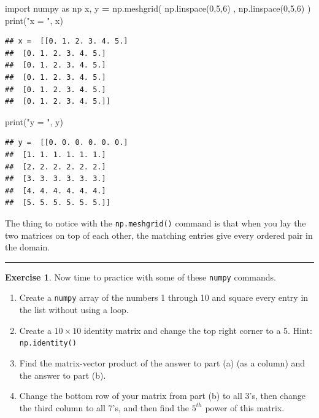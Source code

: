 \documentclass[
]{book}
\newenvironment{Shaded}{\begin{snugshade}}{\end{snugshade}}
\newcommand{\BuiltInTok}[1]{#1}
\newcommand{\DecValTok}[1]{\textcolor[rgb]{0.00,0.00,0.81}{#1}}
\newcommand{\ImportTok}[1]{#1}
\newcommand{\NormalTok}[1]{#1}
\newcommand{\OperatorTok}[1]{\textcolor[rgb]{0.81,0.36,0.00}{\textbf{#1}}}
\newcommand{\StringTok}[1]{\textcolor[rgb]{0.31,0.60,0.02}{#1}}
\providecommand{\tightlist}{%
  \setlength{\itemsep}{0pt}\setlength{\parskip}{0pt}}
\theoremstyle{definition}
\theoremstyle{definition}
\theoremstyle{definition}
\newtheorem{exercise}{Exercise}[chapter]
\theoremstyle{remark}
\begin{document}
\begin{Shaded}
\begin{Highlighting}[]
\ImportTok{import}\NormalTok{ numpy }\ImportTok{as}\NormalTok{ np}
\NormalTok{x, y }\OperatorTok{=}\NormalTok{ np.meshgrid( np.linspace(}\DecValTok{0}\NormalTok{,}\DecValTok{5}\NormalTok{,}\DecValTok{6}\NormalTok{) , np.linspace(}\DecValTok{0}\NormalTok{,}\DecValTok{5}\NormalTok{,}\DecValTok{6}\NormalTok{) )}
\BuiltInTok{print}\NormalTok{(}\StringTok{"x = "}\NormalTok{, x)}
\end{Highlighting}
\end{Shaded}

\begin{verbatim}
## x =  [[0. 1. 2. 3. 4. 5.]
##  [0. 1. 2. 3. 4. 5.]
##  [0. 1. 2. 3. 4. 5.]
##  [0. 1. 2. 3. 4. 5.]
##  [0. 1. 2. 3. 4. 5.]
##  [0. 1. 2. 3. 4. 5.]]
\end{verbatim}

\begin{Shaded}
\begin{Highlighting}[]
\BuiltInTok{print}\NormalTok{(}\StringTok{"y = "}\NormalTok{, y)}
\end{Highlighting}
\end{Shaded}

\begin{verbatim}
## y =  [[0. 0. 0. 0. 0. 0.]
##  [1. 1. 1. 1. 1. 1.]
##  [2. 2. 2. 2. 2. 2.]
##  [3. 3. 3. 3. 3. 3.]
##  [4. 4. 4. 4. 4. 4.]
##  [5. 5. 5. 5. 5. 5.]]
\end{verbatim}

The thing to notice with the \texttt{np.meshgrid()} command is that when you lay the two matrices on top of each other, the matching entries give every ordered pair in the domain.

\begin{center}\rule{0.5\linewidth}{0.5pt}\end{center}

\begin{exercise}
\protect\hypertarget{exr:unnamed-chunk-748}{}{\label{exr:unnamed-chunk-748} }Now time to practice with some of these \texttt{numpy} commands.

\begin{enumerate}
\def\labelenumi{\alph{enumi}.}
\tightlist
\item
  Create a \texttt{numpy} array of the numbers 1 through 10 and square every entry in the list without using a loop.
\item
  Create a \(10 \times 10\) identity matrix and change the top right corner to a 5. Hint: \texttt{np.identity()}
\item
  Find the matrix-vector product of the answer to part (a) (as a column) and the answer to part (b).
\item
  Change the bottom row of your matrix from part (b) to all 3's, then change the third column to all 7's, and then find the \(5^{th}\) power of this matrix.
\end{enumerate}
\end{exercise}
\end{document}
